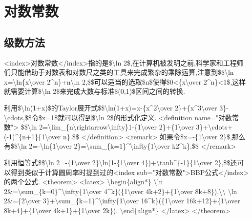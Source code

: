 \documentclass[
]{article}
\begin{document}
\hypertarget{ux5bf9ux6570ux5e38ux6570}{%
\section{对数常数}\label{ux5bf9ux6570ux5e38ux6570}}

\hypertarget{ux7ea7ux6570ux65b9ux6cd5-2}{%
\subsection{级数方法}\label{ux7ea7ux6570ux65b9ux6cd5-2}}

\textless index\textgreater 对数常数\textless/index\textgreater 指的是\$\textbackslash ln
2\$,在计算机被发明之前,科学家和工程师们只能借助于对数表和对数尺之类的工具来完成繁杂的乘除运算,注意到\$\$\textbackslash ln
x=\textbackslash ln\{x\textbackslash over 2\^{}n\}+n\textbackslash ln
2,\$\$可以适当的选取\$n\$使得\$0\textless\{x\textbackslash over
2\^{}n\}\textless1\$,这样就需要计算\$\textbackslash ln
2\$来完成大数与标准\$(0,1)\$区间之间的转换.

利用\$\textbackslash ln(1+x)\$的Taylor展开式\$\$\textbackslash ln(1+x)=x-\{x\^{}2\textbackslash over
2\}+\{x\^{}3\textbackslash over
3\}-\textbackslash cdots,\$\$令\$x=1\$就可以得到\$\textbackslash ln
2\$的形式化定义. \textless definition name="对数常数"\textgreater{}
\$\$\textbackslash ln
2=\textbackslash lim\_\{n\textbackslash rightarrow\textbackslash infty\}1-\{1\textbackslash over
2\}+\{1\textbackslash over
3\}+\textbackslash cdots+(-1)\^{}\{n+1\}\{1\textbackslash over n\}.\$\$
\textless/definition\textgreater{} \textless remark\textgreater{}
如果令\$x=-\{1\textbackslash over 2\}\$,那么有\$\$\textbackslash ln
2=-\textbackslash ln\{1\textbackslash over
2\}=\textbackslash sum\_\{k=1\}\^{}\textbackslash infty\{1\textbackslash over
k2\^{}k\}.\$\$ \textless/remark\textgreater{}

利用恒等式\$\$\textbackslash ln 2=-\{1\textbackslash over
2\}\textbackslash ln(1-\{1\textbackslash over
4\})+\textbackslash tanh\^{}\{-1\}\{1\textbackslash over
2\},\$\$还可以得到类似于计算圆周率时提到过的\textless index
sub="对数常数"\textgreater BBP公式\textless/index\textgreater 的两个公式.
\textless theorem\textgreater{} \textless latex\textgreater{}
\textbackslash begin\{align*\} \textbackslash ln
2\&=\textbackslash sum\_\{k=0\}\^{}\textbackslash infty\{1\textbackslash over
4\^{}k\}(\{1\textbackslash over 4k+2\}+\{1\textbackslash over
8k+8\}),\textbackslash\textbackslash{} \textbackslash ln
2\&=\{2\textbackslash over
3\}+\textbackslash sum\_\{k=1\}\^{}\textbackslash infty\{1\textbackslash over
16\^{}k\}(\{1\textbackslash over 16k+12\}+\{1\textbackslash over
8k+4\}+\{1\textbackslash over 4k+1\}+\{1\textbackslash over 2k\}).
\textbackslash end\{align*\} \textless/latex\textgreater{}
\textless/theorem\textgreater{}
\end{document}

